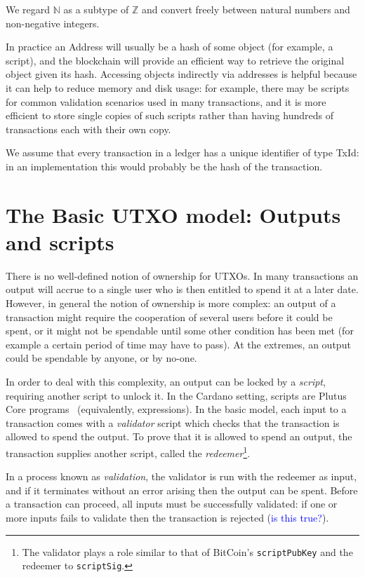 \documentclass[a4paper]{article}
\newcommand{\blue}[1]{\textcolor{blue}{#1}}
\renewcommand{\i}{\textit}  %
\newcommand{\s}{\textsf}  %
\theoremstyle{definition}  %
\newcommand\Z{\ensuremath{\mathbb{Z}}}
\newcommand\N{\ensuremath{\mathbb{N}}}
\begin{document}
\noindent We regard $\N$ as a subtype of $\Z$ and convert freely between
natural numbers and non-negative integers.

\medskip
\noindent In practice an \textsf{Address} will usually be a hash of
some object (for example, a script), and the blockchain will provide
an efficient way to retrieve the original object given its hash.
Accessing objects indirectly via addresses is helpful because it can
help to reduce memory and disk usage: for example, there may be
scripts for common validation scenarios used in many transactions, and
it is more efficient to store single copies of such scripts rather
than having hundreds of transactions each with their own copy.

\medskip
\noindent We assume that every transaction in a ledger has a unique identifier
of type \s{TxId}: in an implementation this would probably be the
hash of the transaction.





\section{The Basic UTXO model: Outputs and scripts}
\label{sec:utxo-intro}

There is no well-defined notion of ownership for UTXOs.  In many
transactions an output will accrue to a single user who is then
entitled to spend it at a later date.  However, in general the notion
of ownership is more complex: an output of a transaction might require
the cooperation of several users before it could be spent, or it might
not be spendable until some other condition has been met (for example
a certain period of time may have to pass).  At the extremes, an
output could be spendable by anyone, or by no-one.

In order to deal with this complexity, an output can be locked by a
\textit{script}, requiring another script to unlock it.  In the
Cardano setting, scripts are Plutus Core
programs~\cite{Plutus-Core-spec} (equivalently, expressions).  In the
basic model, each input to a transaction comes with a \i{validator}
script which checks that the transaction is allowed to spend the
output. To prove that it is allowed to spend an output, the
transaction supplies another script, called the \i{redeemer}\footnote{
  The validator plays a role similar to that of BitCoin's
  \texttt{scriptPubKey} and the redeemer to \texttt{scriptSig}.}.

In a process known as \i{validation}, the validator is run with the
redeemer as input, and if it terminates without an error arising then
the output can be spent.  Before a transaction can proceed, all inputs
must be successfully validated: if one or more inputs fails to validate
then the transaction is rejected (\blue{is this true?}).
\end{document}
